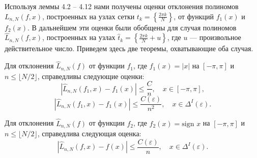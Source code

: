 Используя леммы 4.2 -- 4.12 нами получены оценки отклонения полиномов $L_{n,N}(f,x)$, построенных на узлах сетки $t_k = \left\{ \frac{2\pi k}{N} \right\}$, от функций $f_1(x)$ и $f_2(x)$.
В дальнейшем эти оценки были обобщены для случая полиномов $\hat{L}_{n,N}(f,x)$, построенных на узлах $\hat{t}_k = \left\{ \frac{2\pi k}{N} + u \right\}$, где $u$ --- произвольное действительное число.
Приведем здесь две теоремы, охватывающие оба случая.

\begin{theorem} \label{th2_abs_2}
	Для отклонения $\hat{L}_{n,N}(f)$ от функции $f_1$, где $f_1(x) = |x|$ на $[-\pi,\pi]$ и $n \leq \lfloor N/2\rfloor$, справедливы следующие оценки:
	\begin{equation*}
		|\hat{L}_{n,N}(f_1,x) - f_1(x)| \leq \frac{C}{n}, \quad x \in [-\pi,\pi],
	\end{equation*}
	\begin{equation*}
		|\hat{L}_{n,N}(f_1,x) - f_1(x)| \leq \frac{C(\varepsilon)}{n^2}, \quad x \in \Delta^I(\varepsilon).
	\end{equation*}
\end{theorem}
\begin{theorem} \label{th2_sign_2}
	Для отклонения $\hat{L}_{n,N}(f)$ от функции $f_2$, где $f_2(x) = \mbox{sign } x$ на $[-\pi,\pi]$ и $n \leq \lfloor N/2\rfloor$, справедлива следующая оценка:
	\begin{equation*}
		|\hat{L}_{n,N}(f,x) - f(x)| \leq \frac{C(\varepsilon)}{n}, \quad x \in \Delta^I(\varepsilon).
	\end{equation*}
\end{theorem} 